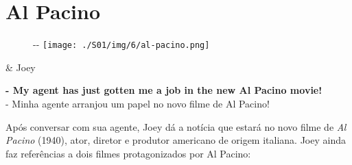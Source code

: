 \hypertarget{al-pacino}{%
\section{Al Pacino}\label{al-pacino}}

\begin{figure}[!ht]
  \begin{adjustwidth}{-\oddsidemargin-1in}{-\rightmargin}
    \centering
    \texttt{[image: ./S01/img/6/al-pacino.png]}
  \end{adjustwidth}
\end{figure}

\begin{tcolorbox}[enhanced,center upper,
    drop fuzzy shadow southeast, boxrule=0.3pt,
    lower separated=false, breakable,
    colframe=black!30!dialogoBorder,colback=white]
\begin{minipage}[c]{0.16\linewidth}
   & \centering \scriptsize{Joey}
\end{minipage}
\hfill
\begin{minipage}[c]{0.8\linewidth}
  \textbf{- My agent has just gotten me a job in the new Al Pacino movie!}\\
  - Minha agente arranjou um papel no novo filme de Al Pacino!
\end{minipage}
\end{tcolorbox}

Após conversar com sua agente, Joey dá a notícia que estará no novo
filme de \emph{Al Pacino} (1940), ator, diretor e produtor americano de
origem italiana. Joey ainda faz referências a dois filmes protagonizados
por Al Pacino:

